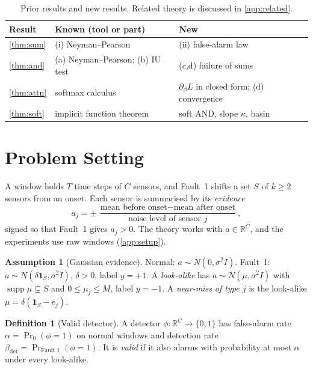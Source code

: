 \documentclass{article}
\theoremstyle{plain}
\theoremstyle{definition}
\newtheorem{definition}{Definition}
\newtheorem{assumption}{Assumption}
\theoremstyle{remark}
\newcommand{\R}{\mathbb{R}}
\newcommand{\one}{\mathbf{1}}
\newcommand{\bdet}{\beta_{\mathrm{det}}}
\begin{document}
\begin{table}[t]
  \caption{Prior results and new results. Related theory \citep{tarzanagh2023,abbe2023,bhattamishra2023} is discussed in \cref{app:related}.}\label{tab:known}
  \vspace{-1mm}
  \centering\footnotesize\setlength{\tabcolsep}{3pt}
  \begin{tabular}{@{}>{\raggedright\arraybackslash}p{}>{\raggedright\arraybackslash}p{}>{\raggedright\arraybackslash}p{}@{}}
    \toprule
    Result & Known (tool or part) & New\\
    \midrule
    \cref{thm:sum} & (i) Neyman--Pearson & (ii) false-alarm law\\
    \cref{thm:and} & (a) Neyman--Pearson; (b) IU test \citep{berger1982} & (c,d) failure of sums\\
    \cref{thm:attn} & softmax calculus & $\partial_\beta L$ in closed form; (d) convergence\\
    \cref{thm:soft} & implicit function theorem & soft AND, slope $\kappa$, basin\\
    \bottomrule
  \end{tabular}
  \vspace{-3mm}
\end{table}

\section{Problem Setting}\label{sec:setup}

A window holds $T$ time steps of $C$ sensors, and Fault~1 shifts a set $S$ of $k\ge2$ sensors from an onset. Each sensor is summarised by its \emph{evidence}
\[
  a_j=\pm\,\frac{\text{mean before onset}-\text{mean after onset}}{\text{noise level of sensor }j},
\]
signed so that Fault~1 gives $a_j>0$. The theory works with $a\in\R^C$, and the experiments use raw windows (\cref{app:setup}).

\begin{assumption}[Gaussian evidence]\label{ass:gauss}
Normal: $a\sim N(0,\sigma^2I)$. Fault~1: $a\sim N(\delta\one_S,\sigma^2I)$, $\delta>0$, label $y=+1$. A \emph{look-alike} has $a\sim N(\mu,\sigma^2I)$ with $\operatorname{supp}\mu\subsetneq S$ and $0\le\mu_j\le M$, label $y=-1$. A \emph{near-miss of type $j$} is the look-alike $\mu=\delta(\one_S-e_j)$.
\end{assumption}

\begin{definition}[Valid detector]\label{def:valid}
A detector $\phi:\R^C\to\{0,1\}$ has false-alarm rate $\alpha=\Pr_0(\phi=1)$ on normal windows and detection rate $\bdet=\Pr_{\text{Fault 1}}(\phi=1)$. It is \emph{valid} if it also alarms with probability at most $\alpha$ under every look-alike.
\end{definition}
\end{document}
